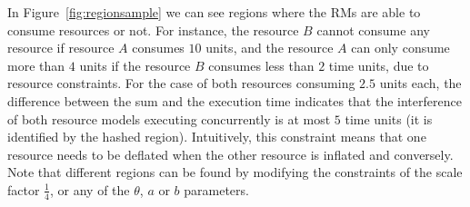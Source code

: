 In Figure~\ref{fig:regionsample} we can see regions where the \ac{RM}s are able to consume resources or not. For instance, the resource $B$ cannot consume any resource if resource $A$ consumes $10$ units, and the resource $A$ can only consume more than $4$ units if the resource $B$ consumes less than $2$ time units, due to resource constraints.  For the case of both resources consuming $2.5$ units each, the difference between the sum and the execution time indicates that the interference of both resource models executing concurrently is at most $5$ time units (it is identified by the hashed region). Intuitively, this constraint means that one resource needs to be deflated when the other resource is inflated and conversely.
%
Note that different regions can be found by modifying the constraints of the scale factor $\frac{1}{4}$, or any of the $\theta$, $a$ or $b$ parameters.



